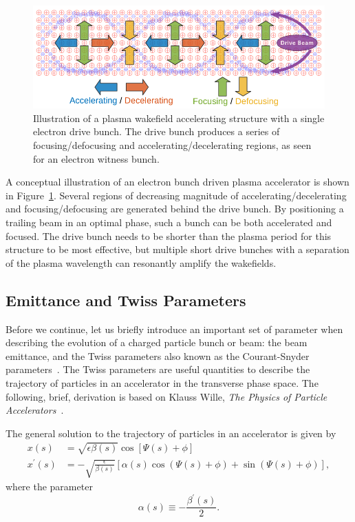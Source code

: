 \begin{figure}[hbt]
    \centering
    \includegraphics[width=0.85\linewidth]{figures/PlasmaWakefield}
    \caption{\label{Fig:PWFA:Illust} Illustration of a plasma wakefield accelerating structure with a single electron drive bunch.
    The drive bunch produces a series of focusing\slash de\-fo\-cus\-ing and accelerating\slash de\-cel\-e\-rat\-ing regions, as seen for an electron witness bunch.}
\end{figure}

A conceptual illustration of an electron bunch driven plasma accelerator is shown in Figure~\ref{Fig:PWFA:Illust}.
Several regions of decreasing magnitude of accelerating\slash decelerating and focusing\slash defocusing are generated behind the drive bunch.
By positioning a trailing beam in an optimal phase, such a bunch can be both accelerated and focused.
The drive bunch needs to be shorter than the plasma period for this structure to be most effective, but multiple short drive bunches with a separation of the plasma wavelength can resonantly amplify the wakefields.

\subsection{Emittance and Twiss Parameters}
\label{Int:BPI:EnTwiss}

Before we continue, let us briefly introduce an important set of parameter when describing the evolution of a charged particle bunch or beam: the beam emittance, and the Twiss parameters also known as the Courant-Snyder parameters~\cite{courant:1958}.
The Twiss parameters are useful quantities to describe the trajectory of particles in an accelerator in the transverse phase space.
The following, brief, derivation is based on Klauss Wille, \textit{The Physics of Particle Accelerators}~\cite{wille:2001}.

The general solution to the trajectory of particles in an accelerator is given by
\begin{align}
    x(s)          &=  \sqrt{\epsilon\beta(s)} \cos\left[\Psi(s) + \phi\right] \label{EQ:PTrajX} \\
    x^{\prime}(s) &= -\sqrt{\frac{\epsilon}{\beta(s)}}
                     \left[\alpha(s)\cos\left(\Psi(s) + \phi\right) + \sin\left(\Psi(s) + \phi\right)\right], \label{EQ:PTrajXP}
\end{align}
where the parameter
\begin{equation}
    \alpha(s) \equiv -\frac{\beta^{\prime}(s)}{2}. \label{EQ:TwissAlpha}
\end{equation}

